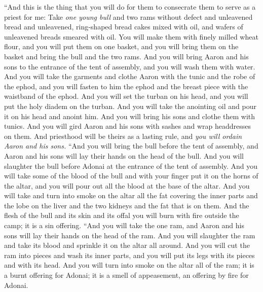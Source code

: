 \begin{biblechapter} %
 “And this is the thing that you will do for them to consecrate them to serve as a priest for me: Take \textit{one young bull} and two rams without defect
\verse and unleavened bread and unleavened, ring-shaped bread cakes mixed with oil, and wafers of unleavened breads smeared with oil. You will make them with finely milled wheat flour,
\verse and you will put them on one basket, and you will bring them on the basket and bring the bull and the two rams.
\verse And you will bring Aaron and his sons to the entrance of the tent of assembly, and you will wash them with water.
\verse And you will take the garments and clothe Aaron with the tunic and the robe of the ephod, and you will fasten to him the ephod and the breast piece with the waistband of the ephod.
\verse And you will set the turban on his head, and you will put the holy diadem on the turban.
\verse And you will take the anointing oil and pour it on his head and anoint him.
\verse And you will bring his sons and clothe them with tunics.
\verse And you will gird Aaron and his sons with sashes and wrap headdresses on them. And priesthood will be theirs as a lasting rule, and \textit{you will ordain Aaron and his sons.}
\verse “And you will bring the bull before the tent of assembly, and Aaron and his sons will lay their hands on the head of the bull.
\verse And you will slaughter the bull before Adonai at the entrance of the tent of assembly.
\verse And you will take some of the blood of the bull and with your finger put it on the horns of the altar, and you will pour out all the blood at the base of the altar.
\verse And you will take and turn into smoke on the altar all the fat covering the inner parts and the lobe on the liver and the two kidneys and the fat that is on them.
\verse And the flesh of the bull and its skin and its offal you will burn with fire outside the camp; it is a sin offering.
\verse “And you will take the one ram, and Aaron and his sons will lay their hands on the head of the ram.
\verse And you will slaughter the ram and take its blood and sprinkle it on the altar all around.
\verse And you will cut the ram into pieces and wash its inner parts, and you will put its legs with its pieces and with its head.
\verse And you will turn into smoke on the altar all of the ram; it is a burnt offering for Adonai; it is a smell of appeasement, an offering by fire for Adonai.

\end{biblechapter}
